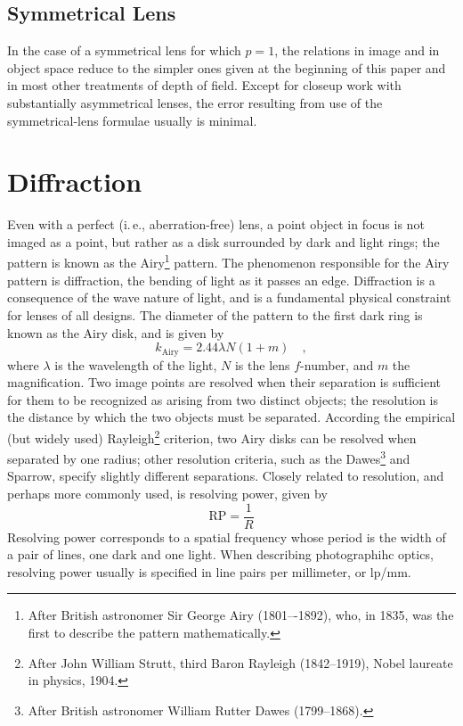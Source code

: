 \documentclass[11pt, oneside]{scrartcl}   	%
\begin{document}
\subsection{Symmetrical Lens}

In the case of a symmetrical lens for which $p = 1$, the relations in image and in object space reduce to the simpler ones given at the beginning of this paper and in most other treatments of depth of field. Except for closeup work with substantially asymmetrical lenses, the error resulting from use of the symmetrical-lens formulae usually is minimal.

\section{Diffraction}
\label{sec:diffraction}


Even with a perfect (i.\,e., aberration-free) lens, a point object in
focus is not imaged as a point, but rather as a disk surrounded by
dark and light rings; the pattern is known as the Airy\footnote{After
  British astronomer Sir George Airy (1801–-1892), who, in 1835, was
  the first to describe the pattern mathematically.} pattern. The
phenomenon responsible for the Airy pattern is diffraction, the
bending of light as it passes an edge. Diffraction is a consequence of
the wave nature of light, and is a fundamental physical constraint for
lenses of all designs. The diameter of the pattern to the first dark
ring is known as the Airy disk, and is given by
\begin{equation}
  \label{eq:airy}
   k_\mathrm{Airy} = 2.44\lambda N(1+m)\quad,
\end{equation}
where $\lambda$ is the wavelength of the light, $N$ is the lens
$f$-number, and $m$ the magnification. Two image points are resolved
when their separation is sufficient for them to be recognized as
arising from two distinct objects; the resolution is the distance by
which the two objects must be separated. According the empirical (but
widely used) Rayleigh\footnote{After John William Strutt, third Baron
  Rayleigh (1842–1919), Nobel laureate in physics, 1904.} criterion,
two Airy disks can be resolved when separated by one radius; other
resolution criteria, such as the Dawes\footnote{After British
  astronomer William Rutter Dawes (1799–1868).} and Sparrow, specify
slightly different separations. Closely related to resolution, and
perhaps more commonly used, is resolving power, given by
\begin{equation}
  \label{eq:respow}
  \mathrm{RP} = \frac 1 R
\end{equation}
Resolving power corresponds to a spatial frequency whose period is the width of a pair of lines, one dark and one light. When describing photographihc optics, resolving power usually is specified in line pairs per millimeter, or lp/mm.
\end{document}
